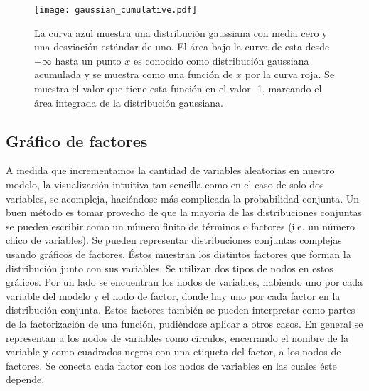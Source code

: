 \documentclass[11pt,twoside,spanish]{report} %
\begin{document}
\begin{figure}[H]
	\centering
	\texttt{[image: gaussian\_cumulative.pdf]}
	\caption{La curva azul muestra una distribuci\'on gaussiana con media cero y una desviaci\'on est\'andar de uno. El \'area bajo la curva de esta desde $-\infty$ hasta un punto $x$ es conocido como distribuci\'on gaussiana acumulada y se muestra como una funci\'on de $x$ por la curva roja. Se muestra el valor que tiene esta funci\'on en el valor -1, marcando el \'area integrada de la distribuci\'on gaussiana.}
	\label{fig:acumulativa}
\end{figure}



\subsection{Gr\'afico de factores}


A medida que incrementamos la cantidad de variables aleatorias en nuestro modelo, la visualizaci\'on intuitiva tan sencilla como en el caso de solo dos variables, se acompleja, haci\'endose m\'as complicada la probabilidad conjunta.
Un buen m\'etodo es tomar provecho  de que la mayor\'ia de las distribuciones conjuntas se pueden escribir como un n\'umero finito de t\'erminos o factores (i.e. un n\'umero chico de variables).
Se pueden representar distribuciones conjuntas complejas usando gr\'aficos de factores.
\'Estos muestran los distintos factores que forman la distribuci\'on junto con sus variables.
Se utilizan dos tipos de nodos en estos gr\'aficos.
Por un lado se encuentran los nodos de variables, habiendo uno por cada variable del modelo y el nodo de factor, donde hay uno por cada factor en la distribuci\'on conjunta.
Estos factores tambi\'en se pueden interpretar como partes de la factorizaci\'on de una funci\'on, pudi\'endose aplicar a otros casos.
En general se representan a los nodos de variables como c\'irculos, encerrando el nombre de la variable y como cuadrados negros con una etiqueta del factor, a los nodos de factores.
Se conecta cada factor con los nodos de variables en las cuales \'este depende.
\end{document}
